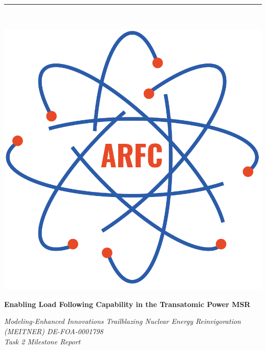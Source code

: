 \documentclass[12pt]{article} %
\begin{document}

\begin{titlepage} %
    \newcommand{\HRule}{\rule{\linewidth}{0.5mm}} %
    
    \center %

    
    \HRule\\[0.2cm]
    
     \begin{minipage}{0.4\textwidth}
        \includegraphics[width=\textwidth]{arfc-logo}
        \end{minipage}%
        \begin{minipage}{0.6\textwidth}
        {\begin{flushright}\huge\bfseries Enabling Load Following Capability in the Transatomic Power MSR \end{flushright}}
        {\begin{flushright}\large\textit{Modeling-Enhanced Innovations Trailblazing Nuclear Energy Reinvigoration (MEITNER) DE-FOA-0001798 \\ Task 2 Milestone Report}\end{flushright}}


\end{minipage}
\end{titlepage}
\end{document}
